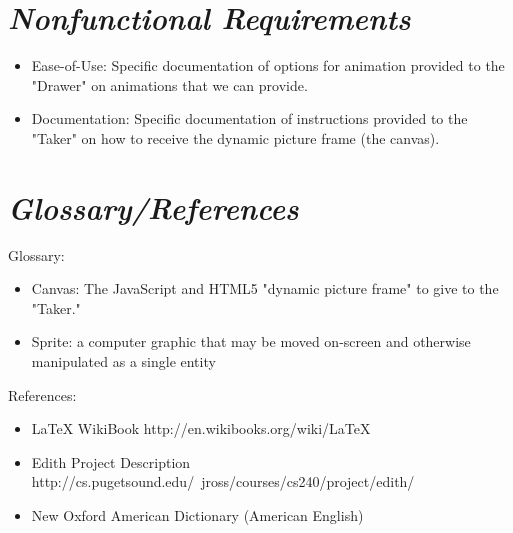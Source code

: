 \documentclass[12pt]{article}
\begin{document}
\section{\emph{Nonfunctional Requirements}}

\begin{itemize}
	\item Ease-of-Use: Specific documentation of options for animation provided to the "Drawer" on animations that we can provide.
	\item Documentation: Specific documentation of instructions provided to the "Taker" on how to receive the dynamic picture frame (the canvas).
\end{itemize}

\section{\emph{Glossary/References}}
Glossary:
\begin{itemize}
	\item Canvas: The JavaScript and HTML5 "dynamic picture frame" to give to the "Taker."
	\item Sprite:  a computer graphic that may be moved on-screen and otherwise manipulated as a single entity
\end{itemize}

\noindent References: 
\begin{itemize}
	\item LaTeX WikiBook http://en.wikibooks.org/wiki/LaTeX
	\item Edith Project Description http://cs.pugetsound.edu/~jross/courses/cs240/project/edith/
	\item New Oxford American Dictionary (American English)
\end{itemize}
\end{document}
